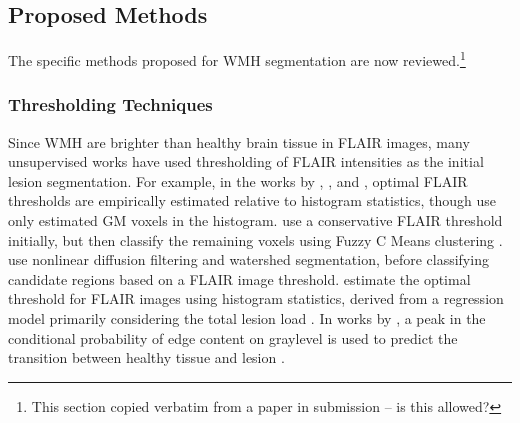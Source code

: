 \subsection{Proposed Methods}
The specific methods proposed for WMH segmentation are now reviewed.\footnote{This section copied verbatim from a paper in submission \cite{Knight2017a} -- is this allowed?}
\subsubsection{Thresholding Techniques}
Since WMH are brighter than healthy brain tissue in FLAIR images, many unsupervised works have used thresholding of FLAIR intensities as the initial lesion segmentation.
For example, in the works by \citeauthor{Jack2001} \cite{Jack2001}, \citeauthor{DeBoer2009b} \cite{DeBoer2009b}, and \citeauthor{Smart2011}, \cite{Smart2011} optimal FLAIR thresholds are empirically estimated relative to histogram statistics, though \citeauthor{DeBoer2009b} use only estimated GM voxels in the histogram.
\citeauthor{Gibson2010} use a conservative FLAIR threshold initially, but then classify the remaining voxels using Fuzzy C Means clustering \cite{Gibson2010}.
\citeauthor{Samaille2012} use nonlinear diffusion filtering and watershed segmentation, before classifying candidate regions based on a FLAIR image threshold.
\citeauthor{Yoo2014} estimate the optimal threshold for FLAIR images using histogram statistics, derived from a regression model primarily considering the total lesion load \cite{Yoo2014}.
In works by \citeauthor{Khademi2014}, a peak in the conditional probability of edge content on graylevel is used to predict the transition between healthy tissue and lesion \cite{Khademi2014,Khademi2015,Knight2016a}.
